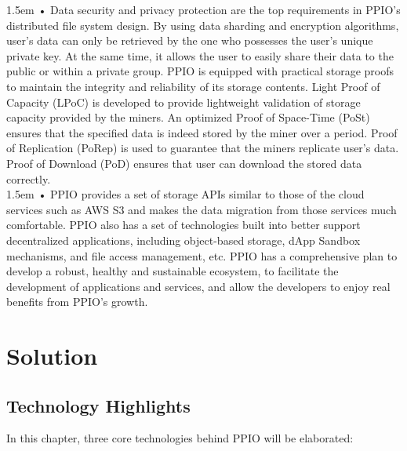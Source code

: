 \documentclass[10pt,a4paper]{article}
\begin{document}
\hangindent 1.5em
\noindent   
• Data security and privacy protection are the top requirements in PPIO's distributed file system design. By using data sharding and encryption algorithms, user's data can only be retrieved by the one who possesses the user's unique private key. At the same time, it allows the user to easily share their data to the public or within a private group. PPIO is equipped with practical storage proofs to maintain the integrity and reliability of its storage contents. Light Proof of Capacity (LPoC) is developed to provide lightweight validation of storage capacity provided by the miners. An optimized Proof of Space-Time (PoSt) ensures that the specified data is indeed stored by the miner over a period. Proof of Replication (PoRep) is used to guarantee that the miners replicate user's data. Proof of Download (PoD) ensures that user can download the stored data correctly.
\vspace{-0.6em}
\\ 

\hangindent 1.5em
\noindent   
• PPIO provides a set of storage APIs similar to those of the cloud services such as AWS S3 and makes the data migration from those services much comfortable. PPIO also has a set of technologies built into better support decentralized applications, including object-based storage, dApp Sandbox mechanisms, and file access management, etc. PPIO has a comprehensive plan to develop a robust, healthy and sustainable ecosystem, to facilitate the development of applications and services, and allow the developers to enjoy real benefits from PPIO's growth.
\vspace{-1em}
\section{Solution} %
\vspace{-0.5em}
 \subsection{Technology Highlights} %
In this chapter, three core technologies behind PPIO will be elaborated:
\vspace{-0.6em}
\\ 
\end{document}
